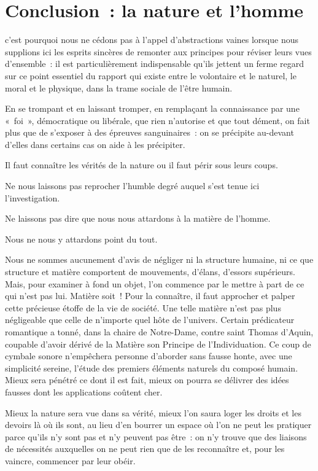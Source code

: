 \documentclass[french,twoside]{book} %
\begin{document}
\section[Conclusion : la nature et l’homme]{Conclusion : la nature et l’homme}
\noindent c’est pourquoi nous ne cédons pas à l’appel d’abstractions vaines lorsque nous supplions ici les esprits sincères de remonter aux principes pour réviser leurs vues d’ensemble : il est particulièrement indispensable qu’ils jettent un ferme regard sur ce point essentiel du rapport qui existe entre le volontaire et le naturel, le moral et le physique, dans la trame sociale de l’être humain.\par
En se trompant et en laissant tromper, en remplaçant la connaissance par une « foi », démocratique ou libérale, que rien n’autorise et que tout dément, on fait plus que de s’exposer à des épreuves sanguinaires : on se précipite au-devant d’elles dans certains cas on aide à les précipiter.\par
Il faut connaître les vérités de la nature ou il faut périr sous leurs coups.\par
Ne nous laissons pas reprocher l’humble degré auquel s’est tenue ici l’investigation.\par
Ne laissons pas dire que nous nous attardons à la matière de l’homme.\par
Nous ne nous y attardons point du tout.\par
Nous ne sommes aucunement d’avis de négliger ni la structure humaine, ni ce que structure et matière comportent de mouvements, d’élans, d’essors supérieurs. Mais, pour examiner à fond un objet, l’on commence par le mettre à part de ce qui n’est pas lui. Matière soit ! Pour la connaître, il faut approcher et palper cette précieuse étoffe de la vie de société. Une telle matière n’est pas plus négligeable que celle de n’importe quel hôte de l’univers. Certain prédicateur romantique a tonné, dans la chaire de Notre-Dame, contre saint Thomas d’Aquin, coupable d’avoir dérivé de la Matière son Principe de l’Individuation. Ce coup de cymbale sonore n’empêchera personne d’aborder sans fausse honte, avec une simplicité sereine, l’étude des premiers éléments naturels du composé humain. Mieux sera pénétré ce dont il est fait, mieux on pourra se délivrer des idées fausses dont les applications coûtent cher.\par
Mieux la nature sera vue dans sa vérité, mieux l’on saura loger les droits et les devoirs là où ils sont, au lieu d’en bourrer un espace où l’on ne peut les pratiquer parce qu’ils n’y sont pas et n’y peuvent pas être : on n’y trouve que des liaisons de nécessités auxquelles on ne peut rien que de les reconnaître et, pour les vaincre, commencer par leur obéir.\par
\end{document}

